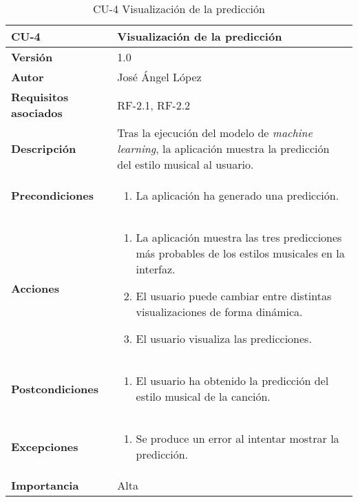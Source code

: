 \begin{table}[p]
	\centering
	\begin{tabularx}{\linewidth}{ p{} p{} }
		\toprule
		\textbf{CU-4}    & \textbf{Visualización de la predicción}\\
		\toprule
		\textbf{Versión}              & 1.0    \\
		\textbf{Autor}                & José Ángel López \\
		\textbf{Requisitos asociados} & RF-2.1, RF-2.2 \\
		\textbf{Descripción}          & Tras la ejecución del modelo de \emph{machine learning}, la aplicación muestra la predicción del estilo musical al usuario. \\
		\textbf{Precondiciones}        & 
		\begin{enumerate}		    
			\def\labelenumi{\arabic{enumi}.}
			\tightlist
			\item La aplicación ha generado una predicción.
		\end{enumerate}\\
		\textbf{Acciones}             &
		\begin{enumerate}
			\def\labelenumi{\arabic{enumi}.}
			\tightlist
			\item La aplicación muestra las tres predicciones más probables de los estilos musicales en la interfaz.
			\item El usuario puede cambiar entre distintas visualizaciones de forma dinámica.
			\item El usuario visualiza las predicciones.
		\end{enumerate}\\
		\textbf{Postcondiciones} &
		\begin{enumerate}
			\def\labelenumi{\arabic{enumi}.}
			\tightlist
			\item El usuario ha obtenido la predicción del estilo musical de la canción.
		\end{enumerate}\\
		\textbf{Excepciones} &
		\begin{enumerate}
			\def\labelenumi{\arabic{enumi}.}
			\tightlist
			\item Se produce un error al intentar mostrar la predicción.
		\end{enumerate}\\
		\textbf{Importancia}          & Alta \\
		\bottomrule
	\end{tabularx}
	\caption{CU-4 Visualización de la predicción}
\end{table}

